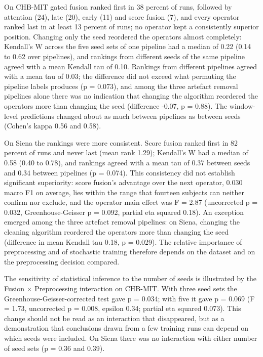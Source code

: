 \documentclass[11pt,a4paper]{article}
\begin{document}
On CHB-MIT gated fusion ranked first in 38 percent of runs, followed by attention (24),
late (20), early (11) and score fusion (7), and every operator ranked last in at least 13
percent of runs; no operator kept a consistently superior position. Changing only the
seed reordered the operators almost completely: Kendall's W across the five seed sets of
one pipeline had a median of 0.22 (0.14 to 0.62 over pipelines), and rankings from
different seeds of the same pipeline agreed with a mean Kendall tau of 0.10. Rankings
from different pipelines agreed with a mean tau of 0.03; the difference did not exceed
what permuting the pipeline labels produces (p = 0.073), and among the three artefact
removal pipelines alone there was no indication that changing the algorithm reordered
the operators more than changing the seed (difference -0.07, p = 0.88). The window-level
predictions changed about as much between pipelines as between seeds (Cohen's kappa
0.56 and 0.58).

On Siena the rankings were more consistent. Score fusion ranked first in 82 percent of
runs and never last (mean rank 1.29); Kendall's W had a median of 0.58 (0.40 to 0.78),
and rankings agreed with a mean tau of 0.37 between seeds and 0.34 between pipelines
(p = 0.074). This consistency did not establish significant superiority: score fusion's
advantage over the next operator, 0.030 macro F1 on average, lies within the range that
fourteen subjects can neither confirm nor exclude, and the operator main effect was
F = 2.87 (uncorrected p = 0.032, Greenhouse-Geisser p = 0.092, partial eta squared
0.18). An exception emerged among the three artefact removal pipelines: on Siena,
changing the cleaning algorithm reordered the operators more than changing the seed
(difference in mean Kendall tau 0.18, p = 0.029). The relative importance of
preprocessing and of stochastic training therefore depends on the dataset and on the
preprocessing decision compared.

The sensitivity of statistical inference to the number of seeds is illustrated by the
Fusion × Preprocessing interaction on CHB-MIT. With three seed sets the
Greenhouse-Geisser-corrected test gave p = 0.034; with five it gave p = 0.069
(F = 1.73, uncorrected p = 0.008, epsilon 0.34; partial eta squared 0.073). This change
should not be read as an interaction that disappeared, but as a demonstration that
conclusions drawn from a few training runs can depend on which seeds were included. On
Siena there was no interaction with either number of seed sets (p = 0.36 and 0.39).
\end{document}
